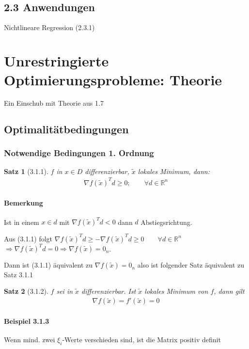\documentclass[ngerman,halfparskip]{scrartcl}
\newtheorem*{satz}{Satz}
\theoremstyle{definition}
\newcommand*{\R}{\mathbb{R}}      %
\begin{document}
\subsection*{2.3 Anwendungen}
Nichtlineare Regression (2.3.1)

\section{Unrestringierte Optimierungsprobleme: Theorie}
Ein Einschub mit Theorie aus 1.7
\subsection{Optimalitätbedingungen}
\subsubsection{Notwendige Bedingungen 1. Ordnung}
\begin{satz}[3.1.1] $f$ in $x\in D$ differenzierbar, $\tilde x$ lokales Minimum, dann:\\
\begin{gather}\tag{3.1.1} \nabla f(\tilde x)^T d \geq 0; \qquad \forall d\in \R^n \end{gather}
\end{satz}
\paragraph{Bemerkung} Ist in einem $x\in d$ mit $\nabla f(\tilde x)^T d < 0$ dann $d$ Abstiegsrichtung. 

Aus (3.1.1) folgt $\nabla f(\tilde x)^T d \geq -\nabla f(\tilde x)^T d \geq 0\qquad \forall d \in \R^n$\\
$\Rightarrow \nabla f(\tilde x)^T d =0 \Rightarrow \nabla f(\tilde x)=0_n$.

Dann ist (3.1.1) äquivalent zu $\nabla f(\tilde x)=0_n$ also ist folgender Satz äquivalent zu Satz 3.1.1
\begin{satz}[3.1.2] $f$ sei in $\tilde x$ differenzierbar. Ist $\tilde x$ lokales Minimum von $f$,  dann gilt
\begin{gather}\tag{3.1.2}\nabla f(\tilde x)=f'(\tilde x)=0\end{gather}
\end{satz}

\paragraph{Beispiel 3.1.3} Wenn mind. zwei $\xi_i$-Werte verschieden sind, ist die Matrix positiv definit
\end{document}

